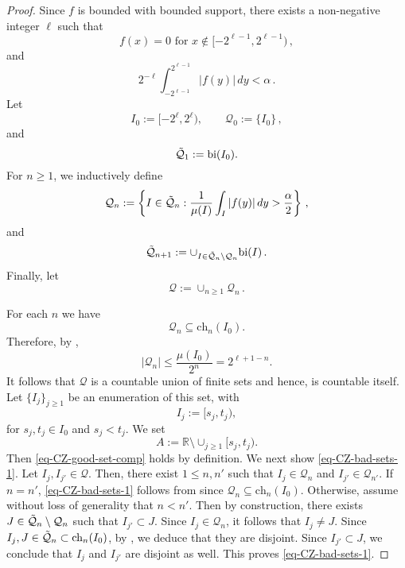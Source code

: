 \begin{proof}
    Since $f$ is bounded with bounded support, there exists a non-negative integer $\ell$ such that
    \begin{equation}
        \label{eq-f-supp}
        f(x)=0 \textrm{ for } x\not\in [-2^{\ell-1}, 2^{\ell-1})\,,
    \end{equation}
    and
    $$2^{-\ell}\int_{-2^{\ell-1}}^{2^{\ell-1}} |f(y)|\, dy< \alpha\,.$$
    Let $$I_0:=[-2^{\ell}, 2^{\ell}),\qquad \mathcal{Q}_0:=\{I_0\}\,,$$
    and
    $$\Tilde{\mathcal{Q}}_1:=\textrm{bi}(I_0).$$
    For $n\geq 1$, we inductively define
    \begin{equation*}
        {\mathcal{Q}}_n:=\left\{I\in \Tilde{\mathcal{Q}}_n: \frac{1}{\mu(I)}\int_{I} |f(y)|\, dy> \frac{\alpha}{2}\right\}\,,
    \end{equation*}
    and
    \begin{equation*}
     \Tilde{\mathcal{Q}}_{n+1}:=\cup_{I\in {\Tilde{\mathcal{Q}}}_n\setminus \mathcal{Q}_n} \textrm{bi} (I)\,.
    \end{equation*}
Finally, let
\begin{equation*}
    \mathcal{Q}:=\cup_{n\geq 1} \mathcal{Q}_n\,.
\end{equation*}

For each $n$ we have
$$\mathcal{Q}_n\subseteq \textrm{ch}_n(I_0).$$
Therefore, by ,
$$|\mathcal{Q}_n|\leq \frac{\mu(I_0)}{2^n}= 2^{\ell+1-n}.$$
It follows that $\mathcal{Q}$ is a countable union of finite sets and hence, is countable itself. Let $\{I_j\}_{j\geq 1}$ be an enumeration of this set, with
$$I_j:=[s_j, t_j),$$
for $s_j, t_j\in I_0$ and $s_j<t_j$.
We set
\begin{equation*}
    A:=\mathbb{R}\setminus \cup_{j\geq 1} [s_j, t_j).
\end{equation*}
Then \eqref{eq-CZ-good-set-comp} holds by definition. We next show \eqref{eq-CZ-bad-sets-1}. Let $I_j, I_{j'}\in \mathcal{Q}$. Then, there exist $1\leq n, n'$ such that $I_j\in \mathcal{Q}_n$ and $I_{j'}\in \mathcal{Q}_{n'}$. If $n=n'$, \eqref{eq-CZ-bad-sets-1} follows from  since $\mathcal{Q}_n\subseteq \textrm{ch}_n(I_0).$ Otherwise, assume without loss of generality that $n<n'$. Then by construction, there exists $J\in \Tilde{\mathcal{Q}}_{n}\setminus {\mathcal{Q}_n}$ such that $I_{j'} \subset J$. Since $I_{j}\in \mathcal{Q}_n$, it follows that $I_j\neq J$. Since $I_j, J\in \Tilde{\mathcal{Q}}_{n}\subset \textrm{ch}_n(I_0)$, by , we deduce that they are disjoint. Since $I_{j'}\subset J$, we conclude that $I_j$ and
$I_{j'}$ are disjoint as well. This proves \eqref{eq-CZ-bad-sets-1}.


\end{proof}
